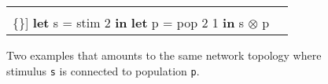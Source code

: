 \begin{figure}
  \begin{tabular}{c c}
    \begin{minipage}{0.5\textwidth}
      \begin{Verbatim}[mathescape,commandchars=\\\{\}]
\textbf{let} s = stim 2 \textbf{in}
  \textbf{let} p = pop 2 1 \textbf{in}
    s $\otimes$ p
      \end{Verbatim}
    \end{minipage} & \begin{minipage}{0.5\textwidth}
       
    \end{minipage}

  \end{tabular}
  \caption{Two examples that amounts to the same network topology 
    where stimulus \texttt{s} is connected to population
    \texttt{p}.}
  \caption{}
\end{figure}
